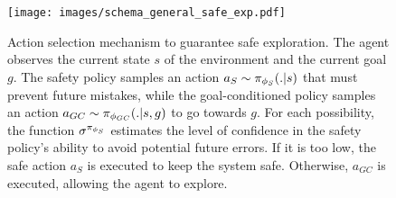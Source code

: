 \begin{figure}[ht!]
    \centering
    \texttt{[image: images/schema\_general\_safe\_exp.pdf]}
    \caption{Action selection mechanism to guarantee safe exploration. The agent 
    observes the current state $s$ of the environment and the current goal $g$.
    The safety policy samples an action $a_S \sim \pi_{\phi_S}(.|s)$ that must prevent future mistakes, while the 
    goal-conditioned policy samples an action $a_{GC} \sim \pi_{\phi_{GC}}(.|s,g)$ to go towards $g$. 
    For each possibility, the function $\sigma^{\pi_{\phi_S}}$ estimates the level of confidence in the safety policy's ability to avoid potential future errors. If it is too low, the safe action $a_S$ is executed to keep the system safe. Otherwise, $a_{GC}$ is executed, allowing the agent to explore. 
    }
    
    \label{fig:schema_switch}
\end{figure}

